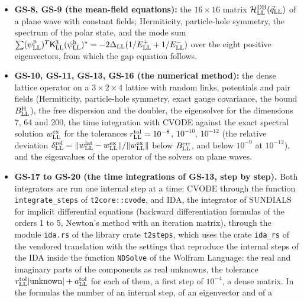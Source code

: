 \documentclass[
  10pt,
]{article}
\begin{document}
\begin{itemize}
  operator, and the five statements on the spinor charges
  \(\mathbf b^\pm_{\rm LL}\mathbf e_4\) (right multiplication by the
  frame, the automorphisms, the derivations \(D_{\rm LL}\) and
  \(D^{\rm v}_{\rm LL}\)), evaluated for random bi-quaternions and
  fields.
\item
  \textbf{GS-8, GS-9 (the mean-field equations):} the \(16\times16\)
  matrix \(\mathcal H^{\rm DB}_{\rm LL}(\vec q_{\rm LL})\) of a plane
  wave with constant fields; Hermiticity, particle-hole symmetry, the
  spectrum of the polar state, and the mode sum
  \(\sum(\psi^{\rm p}_{\rm LL})^T\mathsf K^3_{\rm LL}(\psi^{\rm h}_{\rm LL})^*=-2\Delta_{\rm LL}(1/E^+_{\rm LL}+1/E^-_{\rm LL})\)
  over the eight positive eigenvectors, from which the gap equation
  follows.
\item
  \textbf{GS-10, GS-11, GS-13, GS-16 (the numerical method):} the dense
  lattice operator on a \(3\times2\times4\) lattice with random links,
  potentials and pair fields (Hermiticity, particle-hole symmetry, exact
  gauge covariance, the bound \(B^{\rm H}_{\rm LL}\)), the free
  dispersion and the doubler, the eigensolver for the dimensions 7, 64
  and 200, the time integration with CVODE against the exact spectral
  solution \(w^{\rm ex}_{\rm LL}\) for the tolerances
  \(r^{\rm tol}_{\rm LL}=10^{-8}\), \(10^{-10}\), \(10^{-12}\) (the
  relative deviation
  \(\delta^{\rm rel}_{\rm LL}=\lVert w^{\rm lat}_{\rm LL}-w^{\rm ex}_{\rm LL}\rVert/\lVert w^{\rm ex}_{\rm LL}\rVert\)
  below \(B^{\rm err}_{\rm LL}\), and below \(10^{-9}\) at
  \(10^{-12}\)), and the eigenvalues of the operator of the solvers on
  plane waves.
\item
  \textbf{GS-17 to GS-20 (the time integrations of GS-13, step by
  step).} Both integrators are run one internal step at a time: CVODE
  through the function \texttt{integrate\_steps} of
  \texttt{t2core::cvode}, and IDA, the integrator of SUNDIALS for
  implicit differential equations (backward differentiation formulas of
  the orders 1 to 5, Newton's method with an iteration matrix), through
  the module \texttt{ida.rs} of the library crate \texttt{t2steps},
  which uses the crate \texttt{ida\_rs} of the vendored translation with
  the settings that reproduce the internal steps of the IDA inside the
  function \texttt{NDSolve} of the Wolfram Language: the real and
  imaginary parts of the components as real unknowns, the tolerance
  \(r^{\rm tol}_{\rm LL}\lvert\text{unknown}\rvert+a^{\rm tol}_{\rm LL}\)
  for each of them, a first step of \(10^{-4}\), a dense matrix. In the
  formulas the number of an internal step, of an eigenvector and of a

\end{itemize}
\end{document}
